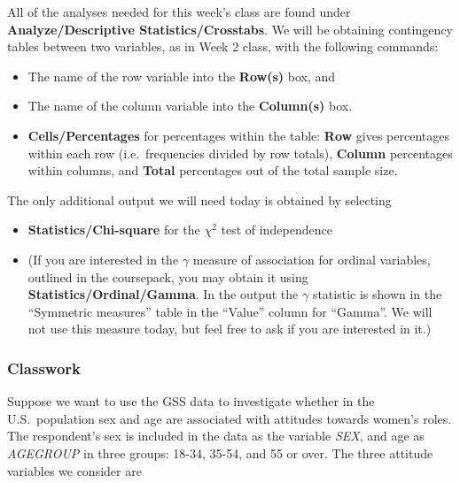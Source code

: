 \documentclass[11pt,a4paper,openany]{book}
\begin{document}
All of the analyses needed for this week's class are found under
\textbf{Analyze/Descriptive Statistics/Crosstabs}. We will be obtaining
contingency tables between two variables, as in Week 2 class, with the
following commands:

\begin{itemize}
\item
  The name of the row variable into the \textbf{Row(s)} box, and
\item
  The name of the column variable into the \textbf{Column(s)} box.
\item
  \textbf{Cells/Percentages} for percentages within the table:
  \textbf{Row} gives percentages within each row (i.e.~frequencies
  divided by row totals), \textbf{Column} percentages within columns,
  and \textbf{Total} percentages out of the total sample size.
\end{itemize}

The only additional output we will need today is obtained by selecting

\begin{itemize}
\item
  \textbf{Statistics/Chi-square} for the \(\chi^{2}\) test of
  independence
\item
  (If you are interested in the \(\gamma\) measure of association for
  ordinal variables, outlined in the coursepack, you may obtain it using
  \textbf{Statistics/Ordinal/Gamma}. In the output the \(\gamma\)
  statistic is shown in the ``Symmetric measures'' table in the
  ``Value'' column for ``Gamma''. We will not use this measure today,
  but feel free to ask if you are interested in it.)
\end{itemize}

\subsubsection*{Classwork}\label{classwork-2}

Suppose we want to use the GSS data to investigate whether in the
U.S.~population sex and age are associated with attitudes towards
women's roles. The respondent's sex is included in the data as the
variable \emph{SEX}, and age as \emph{AGEGROUP} in three groups: 18-34,
35-54, and 55 or over. The three attitude variables we consider are
\end{document}
